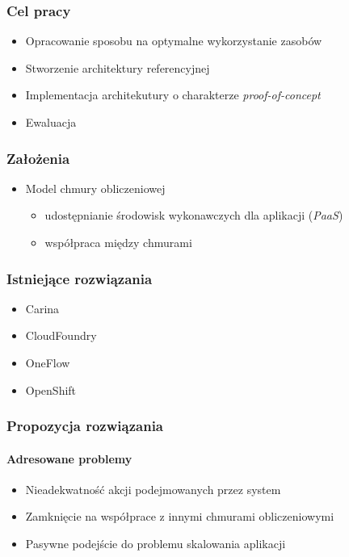 \documentclass{beamer}
\begin{document}
\begin{frame}
\frametitle{Cel pracy}

\begin{itemize}
\item Opracowanie sposobu na optymalne wykorzystanie zasobów

\item Stworzenie architektury referencyjnej
\item Implementacja architekutury o charakterze \textit{proof-of-concept}
\item Ewaluacja
\end{itemize}

\end{frame}





\begin{frame}
\frametitle{Założenia}

\begin{itemize}
\item Model chmury obliczeniowej
	\begin{itemize}
		\item udostępnianie środowisk wykonawczych dla aplikacji (\textit{PaaS})
		\item współpraca między chmurami
	\end{itemize}
\end{itemize}

\end{frame}





\begin{frame}
\frametitle{Istniejące rozwiązania}

\begin{itemize}
\item Carina
\item CloudFoundry

\item OneFlow
\item OpenShift
\end{itemize}

\end{frame}





\begin{frame}
\frametitle{Propozycja rozwiązania}
\framesubtitle{Adresowane problemy}

\begin{itemize}
\item Nieadekwatność akcji podejmowanych przez system
\item Zamknięcie na współprace z innymi chmurami obliczeniowymi
\item Pasywne podejście do problemu skalowania aplikacji 
\end{itemize}

\end{frame}
\end{document}
